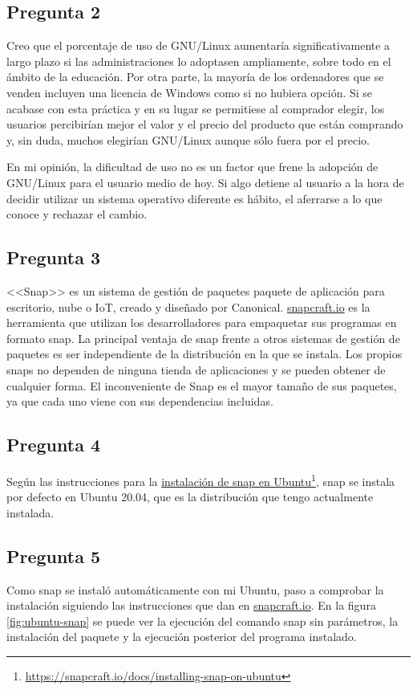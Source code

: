 \subsection{Pregunta 2}
Creo que el porcentaje de uso de GNU/Linux aumentaría significativamente a largo plazo si las administraciones lo adoptasen ampliamente, sobre todo en el ámbito de la educación. Por otra parte, la mayoría de los ordenadores que se venden incluyen una licencia de Windows como si no hubiera opción. Si se acabase con esta práctica y en su lugar se permitiese al comprador elegir, los usuarios percibirían mejor el valor y el precio del producto que están comprando y, sin duda, muchos elegirían GNU/Linux aunque sólo fuera por el precio.

En mi opinión, la dificultad de uso no es un factor que frene la adopción de GNU/Linux para el usuario medio de hoy. Si algo detiene al usuario a la hora de decidir utilizar un sistema operativo diferente es hábito, el aferrarse a lo que conoce y rechazar el cambio.

\subsection{Pregunta 3}
<<Snap>> es un sistema de gestión de paquetes paquete de aplicación para escritorio, nube o IoT, creado y diseñado por Canonical. \href{http://snapcraft.io}{snapcraft.io} es la herramienta que utilizan los desarrolladores para empaquetar sus programas en formato snap.
La principal ventaja de snap frente a otros sistemas de gestión de paquetes es ser independiente de la distribución en la que se instala. Los propios snaps no dependen de ninguna tienda de aplicaciones y se pueden obtener de cualquier forma. El inconveniente de Snap es el mayor tamaño de sus paquetes, ya que cada uno viene con sus dependencias incluidas.

\subsection{Pregunta 4}
Según las instrucciones para la \href{https://snapcraft.io/docs/installing-snap-on-ubuntu}{instalación de snap en Ubuntu}\footnote{\label{nota1}\url{https://snapcraft.io/docs/installing-snap-on-ubuntu}}, snap se instala por defecto en Ubuntu 20.04, que es la distribución que tengo actualmente instalada.

\subsection{Pregunta 5}
Como snap se instaló automáticamente con mi Ubuntu, paso a comprobar la instalación siguiendo las instrucciones que dan en \href{https://snapcraft.io/docs/installing-snap-on-ubuntu}{snapcraft.io}\footnotemark[1]. En la figura \ref{fig:ubuntu-snap} se puede ver la ejecución del comando snap sin parámetros, la instalación del paquete  y la ejecución posterior del programa instalado.

